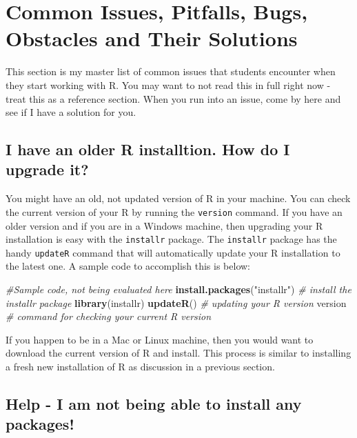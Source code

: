 \documentclass[
]{krantz}
\makeatletter
\newenvironment{Shaded}{\begin{snugshade}}{\end{snugshade}}
\newcommand{\CommentTok}[1]{\textcolor[rgb]{0.37,0.37,0.37}{\textit{#1}}}
\newcommand{\KeywordTok}[1]{\textcolor[rgb]{0.27,0.27,0.27}{\textbf{#1}}}
\newcommand{\NormalTok}[1]{#1}
\newcommand{\StringTok}[1]{\textcolor[rgb]{0.5,0.5,0.5}{#1}}
\newenvironment{kframe}{%
\medskip{}
\setlength{\fboxsep}{.8em}
 \def\at@end@of@kframe{}%
 \ifinner\ifhmode%
  \def\at@end@of@kframe{\end{minipage}}%
  \begin{minipage}{\columnwidth}%
 \fi\fi%
 \def\FrameCommand##1{\hskip\@totalleftmargin \hskip-\fboxsep
 \colorbox{shadecolor}{##1}\hskip-\fboxsep
     \hskip-\linewidth \hskip-\@totalleftmargin \hskip\columnwidth}%
 \MakeFramed {\advance\hsize-\width
   \@totalleftmargin\z@ \linewidth\hsize
   \@setminipage}}%
 {\par\unskip\endMakeFramed%
 \at@end@of@kframe}
\renewenvironment{Shaded}{\begin{kframe}}{\end{kframe}}
\makeatother
\begin{document}
\hypertarget{common-issues-pitfalls-bugs-obstacles-and-their-solutions}{%
\section{Common Issues, Pitfalls, Bugs, Obstacles and Their Solutions}\label{common-issues-pitfalls-bugs-obstacles-and-their-solutions}}

This section is my master list of common issues that students encounter when they start working with R. You may want to not read this in full right now - treat this as a reference section. When you run into an issue, come by here and see if I have a solution for you.

\hypertarget{i-have-an-older-r-installtion.-how-do-i-upgrade-it}{%
\subsection{I have an older R installtion. How do I upgrade it?}\label{i-have-an-older-r-installtion.-how-do-i-upgrade-it}}

You might have an old, not updated version of R in your machine. You can check the current version of your R by running the \texttt{version} command. If you have an older version and if you are in a Windows machine, then upgrading your R installation is easy with the \texttt{installr} package. The \texttt{installr} package has the handy \texttt{updateR} command that will automatically update your R installation to the latest one. A sample code to accomplish this is below:

\begin{Shaded}
\begin{Highlighting}[]
\CommentTok{#Sample code, not being evaluated here}
\KeywordTok{install.packages}\NormalTok{(}\StringTok{"installr"}\NormalTok{) }\CommentTok{# install the installr package }
\KeywordTok{library}\NormalTok{(installr)}
\KeywordTok{updateR}\NormalTok{() }\CommentTok{# updating your R version}
\NormalTok{version }\CommentTok{# command for checking your current R version}
\end{Highlighting}
\end{Shaded}

If you happen to be in a Mac or Linux machine, then you would want to download the current version of R and install. This process is similar to installing a fresh new installation of R as discussion in a previous section.

\hypertarget{help---i-am-not-being-able-to-install-any-packages}{%
\subsection{Help - I am not being able to install any packages!}\label{help---i-am-not-being-able-to-install-any-packages}}
\end{document}
